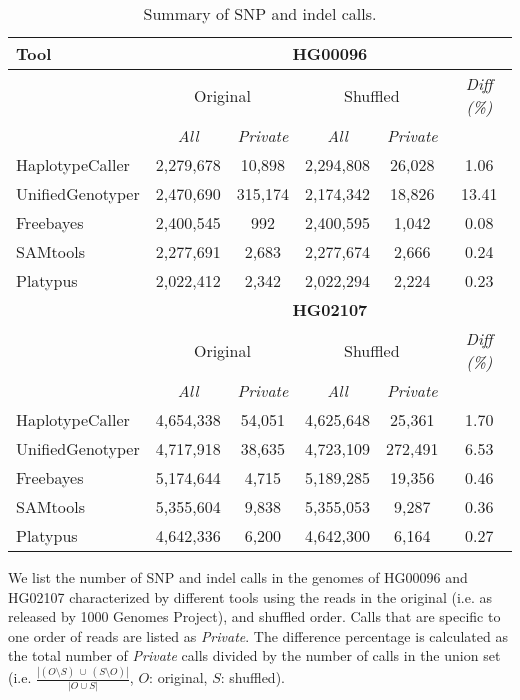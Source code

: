 \documentclass[10pt,a4paper]{article}
\begin{document}
\begin{table}[htb]
\caption{Summary of SNP and indel calls.}
\begin{center}
\begin{tabular}{|l|c|c||c|c||c|}
\hline
{\bf Tool} & \multicolumn{5}{|c|}{\bf HG00096} \\
\hline
{\bf } & \multicolumn{2}{c||}{Original} & \multicolumn{2}{c||}{Shuffled} & {\it Diff (\%) }\\
\cline{2-6}
{\bf } & {\it All } & {\it Private } & {\it All } & {\it Private } & {\it } \\
\hline
HaplotypeCaller & 2,279,678 & 10,898 & 2,294,808 & 26,028 & 1.06 \\
UnifiedGenotyper & 2,470,690 & 315,174 & 2,174,342 & 18,826 & 13.41 \\
Freebayes & 2,400,545 & 992 & 2,400,595 & 1,042 & 0.08 \\
SAMtools & 2,277,691 & 2,683 & 2,277,674 & 2,666 & 0.24 \\
Platypus & 2,022,412 & 2,342 & 2,022,294 & 2,224 & 0.23 \\
\hline
\hline
{\bf } & \multicolumn{5}{|c|}{\bf HG02107} \\
\hline
{\bf } & \multicolumn{2}{c||}{Original} & \multicolumn{2}{c||}{Shuffled} & {\it Diff (\%) }\\
\cline{2-6}
{\bf } & {\it All } & {\it Private } & {\it All } & {\it Private } & {\it } \\
\hline
HaplotypeCaller & 4,654,338 & 54,051 & 4,625,648 & 25,361 & 1.70 \\
UnifiedGenotyper & 4,717,918 & 38,635 & 4,723,109 & 272,491 & 6.53 \\
Freebayes & 5,174,644 & 4,715 & 5,189,285 & 19,356 & 0.46 \\
SAMtools & 5,355,604 & 9,838 & 5,355,053 & 9,287 & 0.36 \\
Platypus & 4,642,336 & 6,200 & 4,642,300 & 6,164 & 0.27 \\
\hline
\end{tabular}
\end{center}
{\footnotesize We list the number of SNP and indel calls in the genomes of HG00096 and HG02107 characterized by different tools using the reads in the original (i.e. as released by 1000 Genomes Project), and shuffled order.
Calls that are specific to one order of reads are listed as {\it Private}.
 The difference percentage is calculated as the total number of {\it Private} calls divided by the number of calls in the union set  (i.e. $\frac{|(O\setminus S)~\cup~ (S\setminus O)|}{|O\cup S|}$, $O$: original, $S$: shuffled). }
\label{tab:snps-orig-vs-shuf}
\end{table}
\end{document}
